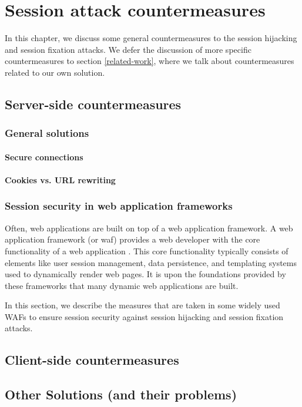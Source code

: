 \chapter{Session attack countermeasures}

In this chapter, we discuss some general countermeasures to the session hijacking and session fixation attacks. We defer the discussion of more specific countermeasures to section \ref{related-work}, where we talk about countermeasures related to our own solution. %

\section{Server-side countermeasures}

\subsection{General solutions}

\subsubsection{Secure connections}\label{ssl}\label{httponly}

\subsubsection{Cookies vs. URL rewriting}\label{url-vs-cookies}

\subsection{Session security in web application frameworks}\label{frameworks}

Often, web applications are built on top of a web application framework. A web application framework (or \gls{waf}) provides a web developer with the core functionality of a web application \cite{Schwartz2010}. This core functionality typically consists of elements like user session management, data persistence, and templating systems used to dynamically render web pages. It is upon the foundations provided by these frameworks that many dynamic web applications are built.

In this section, we describe the measures that are taken in some widely used WAFs to ensure session security against session hijacking and session fixation attacks.


\section{Client-side countermeasures}

\section{Other Solutions (and their problems)}\label{other-solutions}

\label{xss-countermeasures}
